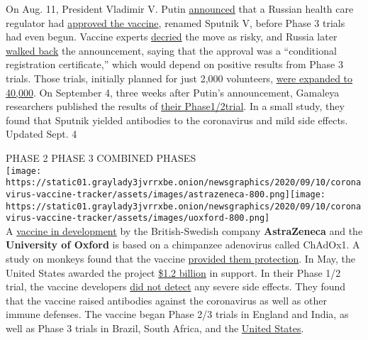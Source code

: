On Aug. 11, President Vladimir V. Putin
\href{https://www.nytimes3xbfgragh.onion/2020/08/11/world/coronavirus-covid-19.html\#link-b092b4d}{announced}
that a Russian health care regulator had
\href{https://www.nytimes3xbfgragh.onion/2020/08/11/world/europe/russia-coronavirus-vaccine.html}{approved
the vaccine}, renamed Sputnik V, before Phase 3 trials had even begun.
Vaccine experts
\href{https://www.nytimes3xbfgragh.onion/2020/08/11/health/russia-covid-19-vaccine-safety.html}{decried}
the move as risky, and Russia later
\href{https://abcnews.go.com/International/russia-announces-expanded-trials-coronavirus-vaccine-approved-10/story?id=72497297}{walked
back} the announcement, saying that the approval was a ``conditional
registration certificate,'' which would depend on positive results from
Phase 3 trials. Those trials, initially planned for just 2,000
volunteers,
\href{https://clinicaltrials.gov/ct2/show/NCT04530396?term=vaccine\&recrs=abdf\&cond=COVID-19\&phase=0123\&sort=nwst\&draw=2\&rank=2}{were
expanded to 40,000}. On September 4, three weeks after Putin's
announcement, Gamaleya researchers published the results of
\href{https://www.nytimes3xbfgragh.onion/2020/09/04/health/russia-covid-vaccine.html?smid=tw-share}{their
Phase}\href{https://www.nytimes3xbfgragh.onion/2020/09/04/health/russia-covid-vaccine.html?smid=tw-share}{1/2}\href{https://www.nytimes3xbfgragh.onion/2020/09/04/health/russia-covid-vaccine.html?smid=tw-share}{trial}.
In a small study, they found that Sputnik yielded antibodies to the
coronavirus and mild side effects.\\
Updated Sept. 4

PHASE 2 PHASE 3 COMBINED PHASES\\
\texttt{[image: https://static01.graylady3jvrrxbe.onion/newsgraphics/2020/09/10/coronavirus-vaccine-tracker/assets/images/astrazeneca-800.png]}\texttt{[image: https://static01.graylady3jvrrxbe.onion/newsgraphics/2020/09/10/coronavirus-vaccine-tracker/assets/images/uoxford-800.png]}\\
A
\href{https://www.nytimes3xbfgragh.onion/2020/04/27/world/europe/coronavirus-vaccine-update-oxford.html}{vaccine
in development} by the British-Swedish company
\textbf{\textbf{AstraZeneca}} and the \textbf{\textbf{University of
Oxford}} is based on a chimpanzee adenovirus called ChAdOx1. A study on
monkeys found that the vaccine
\href{https://www.nytimes3xbfgragh.onion/2020/07/30/health/covid-19-vaccine-monkeys.html}{provided
them protection}. In May, the United States awarded the project
\href{https://www.nytimes3xbfgragh.onion/2020/05/21/health/coronavirus-vaccine-astrazeneca.html?searchResultPosition=7}{\$1.2
billion} in support. In their Phase 1/2 trial, the vaccine developers
\href{https://www.thelancet.com/journals/lancet/article/PIIS0140-6736(20)31604-4/fulltext}{did
not detect} any severe side effects. They found that the vaccine raised
antibodies against the coronavirus as well as other immune defenses. The
vaccine began Phase 2/3 trials in England and India, as well as Phase 3
trials in Brazil, South Africa, and the
\href{https://clinicaltrials.gov/ct2/show/NCT04516746?term=vaccine\&recrs=abdf\&cond=COVID-19\&phase=0123\&sort=nwst\&draw=2\&rank=1}{United
States}.

